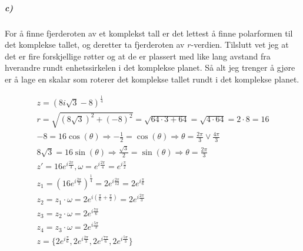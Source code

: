\documentclass[11pt, A4paper, norsk]{article}
\begin{document}
			\subparagraph{c)}
				\begin{flushleft}
For å finne fjerderoten av et komplekst tall er det lettest å finne polarformen til det komplekse tallet, og deretter ta fjerderoten av $r$-verdien. Tilslutt vet jeg at det er fire forskjellige røtter og at de er plassert med like lang avstand fra hverandre rundt enhetssirkelen i det komplekse planet. Så alt jeg trenger å gjøre er å lage en skalar som roterer det komplekse tallet rundt i det komplekse planet.
				\end{flushleft}
				\begin{gather}
z = \left( 8i\sqrt{3} - 8 \right)^{\frac{1}{4}} \\
r = \sqrt{\left( 8\sqrt{3} \right)^{2} + (-8)^{2}} = \sqrt{64 \cdot 3 + 64} = \sqrt{4 \cdot 64} = 2 \cdot 8 = 16 \\
-8 = 16 \cos \left( \theta \right) \Rightarrow - \frac{1}{2} = \cos \left( \theta \right) \Rightarrow \theta = \frac{2\pi}{3} \vee \frac{4\pi}{3} \\
8\sqrt{3} = 16 \sin \left( \theta \right) \Rightarrow \frac{\sqrt{3}}{2} = \sin \left( \theta \right) \Rightarrow \theta = \frac{2\pi}{3} \\
z' = 16 e^{i\frac{2\pi}{3}} , \omega = e^{i \frac{2\pi}{4}} = e^{i \frac{\pi}{2}} \\
z_1 = \left( 16 e^{i \frac{2\pi}{3}} \right)^{\frac{1}{4}} = 2 e^{i \frac{2\pi}{12}} = 2 e^{i \frac{\pi}{6}} \\
z_2 = z_1 \cdot \omega = 2 e^{i \left( \frac{\pi}{6} + \frac{\pi}{2} \right)} = 2 e^{i \frac{2\pi}{3}} \\
z_3 = z_2 \cdot \omega = 2 e^{i \frac{7\pi}{6}} \\
z_4 = z_3 \cdot \omega = 2 e^{i \frac{5\pi}{3}} \\
z = \{ 2 e^{i \frac{\pi}{6}}, 2 e^{i \frac{2\pi}{3}}, 2 e^{i \frac{7\pi}{6}}, 2 e^{i \frac{5\pi}{3}} \}
				\end{gather}
\end{document}
